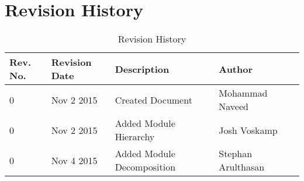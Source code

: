 \documentclass[12pt]{article}
\begin{document}
\newpage
\tableofcontents
\newpage
\listoftables
{}
\newpage
\listoffigures
{}
\newpage

\section*{Revision History}
\begin{table}[!htbp]
	\centering
	\begin{tabular}{ | p{2cm} | l| l | l |p{3cm}|}
		\hline
		Rev. No. & Revision Date & Description & Author \\\hline
		0 & Nov 2 2015 & Created Document & Mohammad Naveed \\\hline
		0 & Nov 2 2015 & Added Module Hierarchy & Josh Voskamp \\\hline
		0 & Nov 4 2015 & Added Module Decomposition & Stephan Arulthasan  \\ \hline
		
	\end{tabular}
	\caption{Revision History}
\end{table}
\newpage
\end{document}

